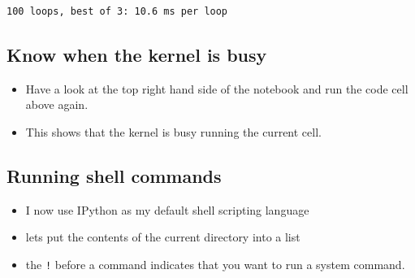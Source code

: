 \documentclass{article}
\begin{document}
    \begin{Verbatim}[commandchars=\\\{\}]
100 loops, best of 3: 10.6 ms per loop
    \end{Verbatim}

    \subsection{Know when the kernel is busy}

\begin{itemize}
\itemsep1pt\parskip0pt
\item
  Have a look at the top right hand side of the notebook and run the
  code cell above again.
\item
  This shows that the kernel is busy running the current cell.
\end{itemize}

    \subsection{Running shell commands}

\begin{itemize}
\itemsep1pt\parskip0pt
\item
  I now use IPython as my default shell scripting language
\item
  lets put the contents of the current directory into a list
\item
  the \texttt{!} before a command indicates that you want to run a
  system command.
\end{itemize}
\end{document}
